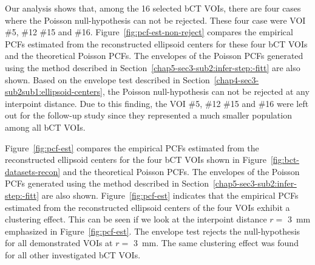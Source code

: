 \documentclass[journal]{IEEEtran}
\begin{document}
Our analysis shows that, among the 16 selected bCT VOIs, there are
four cases where the Poisson null-hypothesis can not be
rejected. These four case were VOI \#5, \#12 \#15 and
\#16. Figure~\ref{fig:pcf-est-non-reject} compares the empirical PCFs
estimated from the reconstructed ellipsoid centers for these four bCT
VOIs and the theoretical Poisson PCFs. The envelopes of the Poisson
PCFs generated using the method described in
Section~\ref{chap5-sec3-sub2:infer-step:-fitt} are also shown. Based
on the envelope test described in
Section~\ref{chap4-sec3-sub2sub1:ellipsoid-centers}, the Poisson
null-hypothesis can not be rejected at any interpoint distance. Due to
this finding, the VOI \#5, \#12 \#15 and \#16 were left out for the
follow-up study since they represented a much smaller population among
all bCT VOIs.


Figure~\ref{fig:pcf-est} compares the empirical PCFs estimated from
the reconstructed ellipsoid centers for the four bCT VOIs shown in
Figure~\ref{fig:bct-datasets-recon} and the theoretical Poisson
PCFs. The envelopes of the Poisson PCFs generated using the method
described in Section~\ref{chap5-sec3-sub2:infer-step:-fitt} are also
shown. Figure~\ref{fig:pcf-est} indicates that the empirical PCFs
estimated from the reconstructed ellipsoid centers of the four VOIs
exhibit a clustering effect. This can be seen if we look at the
interpoint distance $r = $ \SI{3}{\mm} emphasized in
Figure~\ref{fig:pcf-est}. The envelope test rejects the
null-hypothesis for all demonstrated VOIs at $r = $ \SI{3}{\mm}. The
same clustering effect was found for all other investigated bCT VOIs.
\end{document}
